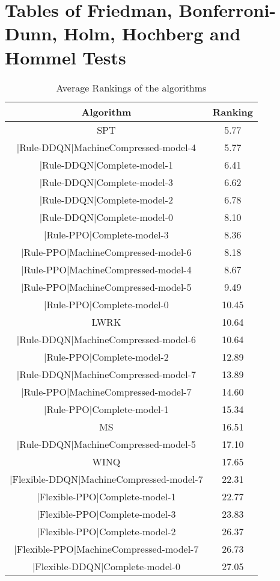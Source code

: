 \documentclass[a3paper,10pt]{article}
\author{}
\date{\today}
\begin{document}
\oddsidemargin 0in \topmargin 0in\maketitle
\section{Tables of Friedman, Bonferroni-Dunn, Holm, Hochberg and Hommel Tests}
\begin{table}[!htp]
\centering
\caption{Average Rankings of the algorithms
}\begin{tabular}{c|c}
Algorithm&Ranking\\
\hline
SPT&5.77\\
|Rule-DDQN|MachineCompressed-model-4&5.77\\
|Rule-DDQN|Complete-model-1&6.41\\
|Rule-DDQN|Complete-model-3&6.62\\
|Rule-DDQN|Complete-model-2&6.78\\
|Rule-DDQN|Complete-model-0&8.10\\
|Rule-PPO|Complete-model-3&8.36\\
|Rule-PPO|MachineCompressed-model-6&8.18\\
|Rule-PPO|MachineCompressed-model-4&8.67\\
|Rule-PPO|MachineCompressed-model-5&9.49\\
|Rule-PPO|Complete-model-0&10.45\\
LWRK&10.64\\
|Rule-DDQN|MachineCompressed-model-6&10.64\\
|Rule-PPO|Complete-model-2&12.89\\
|Rule-DDQN|MachineCompressed-model-7&13.89\\
|Rule-PPO|MachineCompressed-model-7&14.60\\
|Rule-PPO|Complete-model-1&15.34\\
MS&16.51\\
|Rule-DDQN|MachineCompressed-model-5&17.10\\
WINQ&17.65\\
|Flexible-DDQN|MachineCompressed-model-7&22.31\\
|Flexible-PPO|Complete-model-1&22.77\\
|Flexible-PPO|Complete-model-3&23.83\\
|Flexible-PPO|Complete-model-2&26.37\\
|Flexible-PPO|MachineCompressed-model-7&26.73\\
|Flexible-DDQN|Complete-model-0&27.05\\

\end{tabular}
\end{table}
\end{document}
